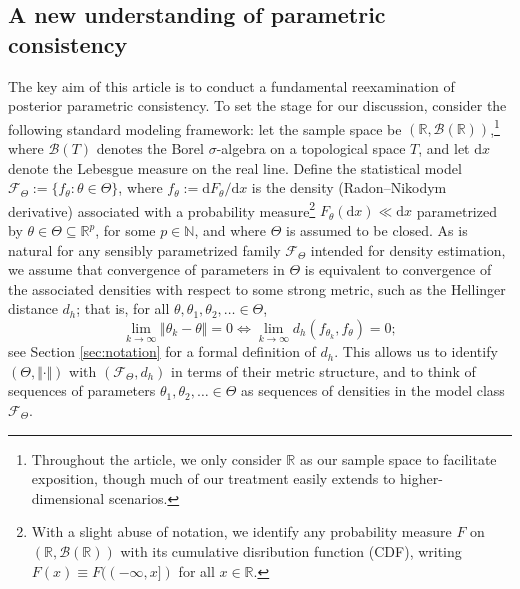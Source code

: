 \documentclass[11pt,twoside]{article}
\def\RR{\mathbb{R}}
\def\NN{\mathbb{N}}
\begin{document}
\subsection{A new understanding of parametric consistency}\label{sub:new_perspective}

The key aim of this article is to conduct a fundamental reexamination of posterior parametric consistency. To set the stage for our discussion, consider the following standard modeling framework: let the sample space be $(\RR, \mathscr{B}(\RR))$,\footnote{Throughout the article, we only consider $\RR$ as our sample space to facilitate exposition, though much of our treatment easily extends to higher-dimensional scenarios.} where $\mathscr{B}(T)$ denotes the Borel $\sigma$-algebra on a topological space $T$, and let $\mathrm{d}x$ denote the Lebesgue measure on the real line. Define the statistical model $\mathcal{F}_\Theta := \{f_\theta : \theta \in \Theta\}$, where $f_\theta := \mathrm{d}F_\theta / \mathrm{d}x$ is the density (Radon--Nikodym derivative) associated with a probability measure\footnote{With a slight abuse of notation, we identify any probability measure $F$ on $(\RR, \mathscr B(\RR))$ with its cumulative disribution function (CDF), writing $F(x)\equiv F((-\infty, x])$ for all $x\in\RR$.} $F_\theta(\mathrm{d}x) \ll \mathrm{d}x$ parametrized by $\theta \in \Theta \subseteq \RR^p$, for some $p \in \NN$, and where $\Theta$ is assumed to be closed. As is natural for any sensibly parametrized family $\mathcal{F}_\Theta$ intended for density estimation, we assume that convergence of parameters in $\Theta$ is equivalent to convergence of the associated densities with respect to some strong metric, such as the Hellinger distance $d_h$; that is, for all $\theta, \theta_1, \theta_2, \ldots \in \Theta$,
%
\begin{equation*}
    \lim_{k \to \infty} \Vert \theta_k - \theta \Vert = 0 \iff \lim_{k \to \infty} d_h(f_{\theta_k}, f_\theta) = 0;
\end{equation*}
%
see Section \ref{sec:notation} for a formal definition of $d_h$. This allows us to identify $(\Theta, \Vert\cdot\Vert)$ with $(\mathcal F_\Theta, d_h)$ in terms of their metric structure, and to think of sequences of parameters $\theta_1, \theta_2,\ldots\in\Theta$ as sequences of densities in the model class $\mathcal F_\Theta$.
\end{document}
